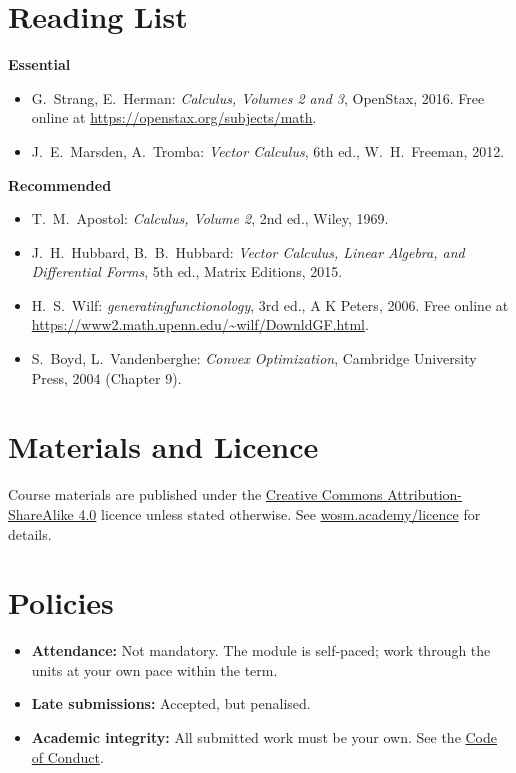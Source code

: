 \documentclass[11pt,a4paper]{article}
\begin{document}
\section{Reading List}
\textbf{Essential}
\begin{itemize}
  \item G.\ Strang, E.\ Herman: \textit{Calculus, Volumes 2 and 3}, OpenStax, 2016. Free online at \url{https://openstax.org/subjects/math}.
  \item J.\ E.\ Marsden, A.\ Tromba: \textit{Vector Calculus}, 6th ed., W.\ H.\ Freeman, 2012.
\end{itemize}
\textbf{Recommended}
\begin{itemize}
  \item T.\ M.\ Apostol: \textit{Calculus, Volume 2}, 2nd ed., Wiley, 1969.
  \item J.\ H.\ Hubbard, B.\ B.\ Hubbard: \textit{Vector Calculus, Linear Algebra, and Differential Forms}, 5th ed., Matrix Editions, 2015.
  \item H.\ S.\ Wilf: \textit{generatingfunctionology}, 3rd ed., A K Peters, 2006. Free online at \url{https://www2.math.upenn.edu/~wilf/DownldGF.html}.
  \item S.\ Boyd, L.\ Vandenberghe: \textit{Convex Optimization}, Cambridge University Press, 2004 (Chapter 9).
\end{itemize}

\section{Materials and Licence}
Course materials are published under the
\href{https://creativecommons.org/licenses/by-sa/4.0/}{Creative Commons Attribution-ShareAlike 4.0}
licence unless stated otherwise. See \href{https://wosm.academy/licence/}{wosm.academy/licence} for details.

\section{Policies}
\begin{itemize}
  \item \textbf{Attendance:} Not mandatory. The module is self-paced; work through the units at your own pace within the term.
  \item \textbf{Late submissions:} Accepted, but penalised.
  \item \textbf{Academic integrity:} All submitted work must be your own.
        See the \href{https://wosm.academy/code-of-conduct/}{Code of Conduct}.
\end{itemize}
\end{document}
